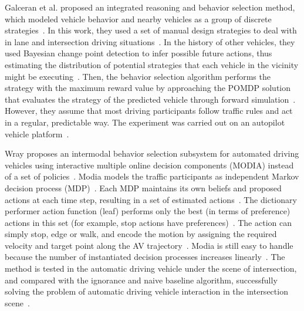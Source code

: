 \documentclass[conference]{IEEEtran}
\begin{document}
Galceran et al. proposed an integrated reasoning and behavior selection method, which modeled vehicle behavior and nearby vehicles as a group of discrete strategies~\cite{galceran2017multipolicy}. In this work, they used a set of manual design strategies to deal with in lane and intersection driving situations~\cite{galceran2017multipolicy}. In the history of other vehicles, they used Bayesian change point detection to infer possible future actions, thus estimating the distribution of potential strategies that each vehicle in the vicinity might be executing~\cite{galceran2017multipolicy}. Then, the behavior selection algorithm performs the strategy with the maximum reward value by approaching the POMDP solution that evaluates the strategy of the predicted vehicle through forward simulation~\cite{galceran2017multipolicy}. However, they assume that most driving participants follow traffic rules and act in a regular, predictable way. The experiment was carried out on an autopilot vehicle platform~\cite{galceran2017multipolicy}.

Wray proposes an intermodal behavior selection subsystem for automated driving vehicles using interactive multiple online decision components (MODIA) instead of a set of policies~\cite{ijcai2017-664}. Modia models the traffic participants as independent Markov decision process (MDP)~\cite{ijcai2017-664}. Each MDP maintains its own beliefs and proposed actions at each time step, resulting in a set of estimated actions~\cite{ijcai2017-664}. The dictionary performer action function (leaf) performs only the best (in terms of preference) actions in this set (for example, stop actions have preferences)~\cite{ijcai2017-664}. The action can simply stop, edge or walk, and encode the motion by assigning the required velocity and target point along the AV trajectory~\cite{ijcai2017-664}. Modia is still easy to handle because the number of instantiated decision processes increases linearly~\cite{ijcai2017-664}. The method is tested in the automatic driving vehicle under the scene of intersection, and compared with the ignorance and naive baseline algorithm, successfully solving the problem of automatic driving vehicle interaction in the intersection scene~\cite{ijcai2017-664}.
\end{document}

